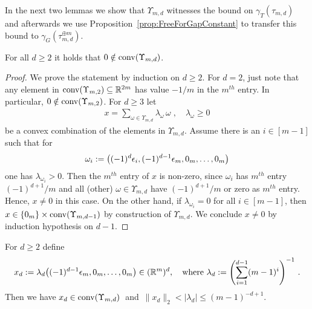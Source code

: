 In the next two lemmas we show that $\Upsilon_{m,d}$ witnesses the bound on $\gamma_{T}(\tau_{m,d})$ and afterwards we use Proposition~\ref{prop:FreeForGapConstant} to transfer this bound to $\gamma_G(\tau_{m,d}^{\oplus m})$.

\begin{lemma} \label{lem:quiverConvHull}
	For all $d \geq 2$ it holds that $0 \notin \operatorname{conv}(\Upsilon_{m,d})$.
\end{lemma}

\begin{proof}
	We prove the statement by induction on $d \geq 2$. For $d=2$, just note that any element in $\operatorname{conv}(\Upsilon_{m,2}) \subseteq \mathbb R^{2m}$ has value $-1/m$ in the $m^{th}$ entry. In particular, $0 \notin \operatorname{conv}(\Upsilon_{m,2})$.
	For $d \geq 3$ let
	\begin{align*}
		x = \sum_{\omega \in \Upsilon_{m,d}} \lambda_\omega \, \omega \; , \quad \lambda_\omega \geq 0
	\end{align*}
	be a convex combination of the elements in $\Upsilon_{m,d}$. Assume there is an $i \in [m-1]$ such that for
	\begin{align*}
		\omega_i := \big( (-1)^d \epsilon_i, (-1)^{d-1} \epsilon_m,0_m,\ldots,0_m \big)
	\end{align*}
	one has $\lambda_{\omega_i} > 0$. Then the $m^{th}$ entry of $x$ is non-zero, since $\omega_i$ has $m^{th}$ entry $(-1)^{d+1}/m$ and all (other) $\omega \in \Upsilon_{m,d}$ have $(-1)^{d+1}/m$ or zero as $m^{th}$ entry. Hence, $x \neq 0$ in this case.
	On the other hand, if $\lambda_{\omega_i} = 0$ for all $i \in [m-1]$, then $x \in \lbrace 0_m \rbrace \times \operatorname{conv}(\Upsilon_{m,d-1})$ by construction of $\Upsilon_{m,d}$. We conclude $x \neq 0$ by induction hypothesis on $d-1$.
\end{proof}

\begin{lemma} \label{lem:quiverDist}
	For $d \geq 2$ define
	\begin{align*}
		x_d := \lambda_d \big( (-1)^{d-1} \epsilon_m, 0_m, \ldots, 0_m\big) \in (\mathbb R^m)^d
		,\quad \text{where } \lambda_d := \left( \sum_{i=1}^{d-1} (m-1)^i \right)^{-1} \, .
	\end{align*}
	Then we have $x_d \in \operatorname{conv}(\Upsilon_{m,d}) \,$ and $\, \|x_d\|_2 < \vert \lambda_d \vert \leq (m-1)^{-d+1}$.
\end{lemma}

